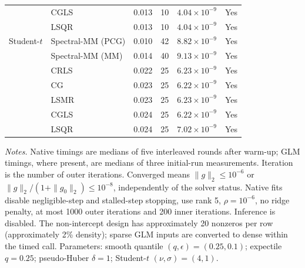 \begin{longtable}{llrrrc}
 & CGLS & 0.013 & 10 & $4.04\times10^{-9}$ & Yes \\
 & LSQR & 0.013 & 10 & $4.04\times10^{-9}$ & Yes \\
\midrule
Student-$t$ & Spectral-MM (PCG) & 0.010 & 42 & $8.82\times10^{-9}$ & Yes \\
 & Spectral-MM (MM) & 0.014 & 40 & $9.13\times10^{-9}$ & Yes \\
 & CRLS & 0.022 & 25 & $6.23\times10^{-9}$ & Yes \\
 & CG & 0.023 & 25 & $6.22\times10^{-9}$ & Yes \\
 & LSMR & 0.023 & 25 & $6.23\times10^{-9}$ & Yes \\
 & CGLS & 0.024 & 25 & $6.22\times10^{-9}$ & Yes \\
 & LSQR & 0.024 & 25 & $7.02\times10^{-9}$ & Yes \\
\end{longtable}
\noindent\textit{Notes.} Native timings are medians of five interleaved rounds after warm-up; GLM timings, where present, are medians of three initial-run measurements. Iteration is the number of outer iterations. Converged means $\|g\|_2\leq10^{-6}$ or $\|g\|_2/(1+\|g_0\|_2)\leq10^{-8}$, independently of the solver status. Native fits disable negligible-step and stalled-step stopping, use rank 5, $\rho=10^{-6}$, no ridge penalty, at most 1000 outer iterations and 200 inner iterations. Inference is disabled.
The non-intercept design has approximately 20 nonzeros per row (approximately 2\% density); sparse GLM inputs are converted to dense within the timed call.
Parameters: smooth quantile $(q,\epsilon)=(0.25,0.1)$; expectile $q=0.25$; pseudo-Huber $\delta=1$; Student-$t$ $(\nu,\sigma)=(4,1)$.
\par
\endgroup
